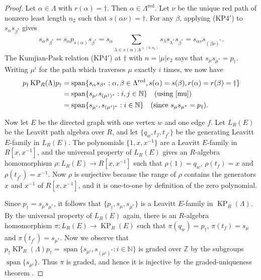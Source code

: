 \documentclass[a4paper,12pt]{amsart}
\numberwithin{equation}{section}
\theoremstyle{definition}
\theoremstyle{remark}
\begin{document}
\begin{proof} Let $\alpha\in\Lambda$ with $r(\alpha)=\dagger$. Then $\alpha\in\Lambda^{{\operatorname{\mathrm{red}}}}$. Let $\nu$ be the unique red path of nonzero least length $n_2$ such that $s(\alpha\nu)=\dagger$.  For any $\beta$, applying (KP4$'$) to  $s_\alpha s_{\beta^*}$ gives 
\begin{equation}\label{mu}
s_\alpha s_{\beta^*}=s_\alpha p_{s(\alpha)}s_{\beta^*}=s_\alpha\sum_{\lambda\in s(\alpha)\Lambda^{\leq(0,n_2)}}s_\lambda s_{\lambda^*}s_{\beta^*}=s_{\alpha\nu}s_{(\beta\nu)^*}.
\end{equation}
The Kumjian-Pask relation (KP4$'$) at $\dagger$ with $n=|\mu|e_2$ says that $s_\mu s_{\mu^*}=p_{\dagger}$.
Writing $\mu^i$ for the path which traverses $\mu$ exactly $i$ times, we now have 
\begin{align*}
p_{\dagger}\operatorname{KP}_R(\Lambda)p_{\dagger}&={\operatorname{\mathrm{span}}}\{s_\alpha s_{\beta^*}: \alpha,\beta\in\Lambda^{{\operatorname{\mathrm{red}}}}, s(\alpha)=s(\beta), r(\alpha)=r(\beta)=\dagger\}\\
&={\operatorname{\mathrm{span}}}\{s_{\mu^i} s_{(\mu^j)^*}:i,j\in{\mathbb{N}}\} \quad\text{(using \eqref{mu})}\\
&={\operatorname{\mathrm{span}}}\{s_{\mu^i}, s_{(\mu^i)^*}:i\in{\mathbb{N}}\}\quad\text{(since $s_\mu s_{\mu^*}=p_\dagger$)}.
\end{align*}

Now let $E$ be the directed graph with one vertex $w$ and one edge $f$. Let $L_R(E)$ be the Leavitt path algebra over $R$, and let $\{q_w, t_f, t_{f^*}\}$ be the generating Leavitt $E$-family in $L_R(E)$. The  polynomials  $\{1, x, x^{-1}\}$ are a Leavitt $E$-family in $R[x,x^{-1}]$, and the universal property of $L_R(E)$ gives an $R$-algebra homomorphism $\rho:L_R(E)\to R[x,x^{-1}]$ such that $\rho(1)=q_w$, $\rho(t_f)=x$ and $\rho(t_{f^*})=x^{-1}$. 
Now $\rho$ is surjective because the range of $\rho$ contains the generators $x$ and $x^{-1}$ of $R[x,x^{-1}]$, and it is one-to-one by definition of the zero polynomial.

Since $p_{\dagger}=s_\mu s_{\mu^*}$, it follows that $\{p_\dagger, s_\mu, s_{\mu^*}\}$ is a Leavitt $E$-family in $\operatorname{KP}_R(\Lambda)$. By the universal property of $L_R(E)$ again, there is an $R$-algebra homomorphism $\pi:L_R(E)\to \operatorname{KP}_R(E)$ such that $\pi(q_w)=p_\dagger$, $\pi(t_f)=s_\mu$ and $\pi(t_{f^*})=s_{\mu^*}$.  Now we observe that $p_{\dagger}\operatorname{KP}_R(\Lambda)p_{\dagger}={\operatorname{\mathrm{span}}}\{s_{\mu^i}, s_{(\mu^i)^*}:i\in{\mathbb{N}}\}$ is graded over ${\mathbb{Z}}$ by the subgroups ${\operatorname{\mathrm{span}}}\{s_{\mu^i}\}$. Thus $\pi$ is graded, and hence it is injective by the graded-uniqueness theorem \cite[Theorem~5.3]{T}.  


\end{proof}
\end{document}
